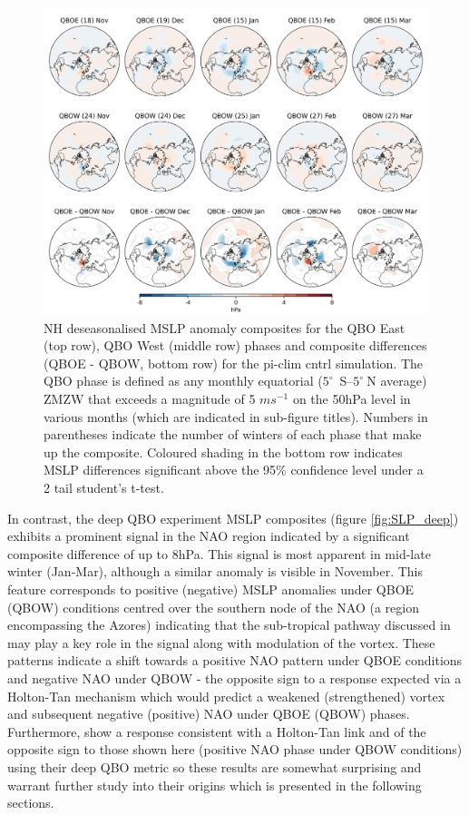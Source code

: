 \begin{figure}[h!]
\begin{center}
\noindent\includegraphics[width =0.8\linewidth]{Figures/Figures-deepQBO/SLP_composites_individual_months_QBO_phases_U_piclim_30hPa_5thresh.png}
\caption[]{NH deseasonalised MSLP anomaly composites for the QBO East (top row), QBO West (middle row) phases and composite differences (QBOE - QBOW, bottom row) for the pi-clim cntrl simulation. The QBO phase is defined as any monthly equatorial ($5^{\circ}$\ S--$5^{\circ}\ $N average) ZMZW that exceeds a magnitude of 5 $ms^{-1}$ on the 50hPa level in various months (which are indicated in sub-figure titles). Numbers in parentheses indicate the number of winters of each phase that make up the composite. Coloured shading in the bottom row indicates MSLP differences significant above the 95\% confidence level under a 2 tail student’s t-test.}
\label{fig:SLP_piclim}
\end{center}
\end{figure}

In contrast, the deep QBO experiment MSLP composites (figure \ref{fig:SLP_deep}) exhibits a prominent signal in the NAO region indicated by a significant composite difference of up to 8hPa. This signal is most apparent in mid-late winter (Jan-Mar), although a similar anomaly is visible in November. This feature corresponds to positive (negative) MSLP anomalies under QBOE (QBOW) conditions centred over the southern node of the NAO (a region encompassing the Azores) indicating that the sub-tropical pathway discussed in \cite{graySurface2018b} may play a key role in the signal along with modulation of the vortex. These patterns indicate a shift towards a positive NAO pattern under QBOE conditions and negative NAO under QBOW - the opposite sign to a response expected via a Holton-Tan mechanism which would predict a weakened (strengthened) vortex and subsequent negative (positive) NAO under QBOE (QBOW) phases. Furthermore, \cite{andrewsObserved2019d} show a response consistent with a Holton-Tan link and of the opposite sign to those shown here (positive NAO phase under QBOW conditions) using their deep QBO metric so these results are somewhat surprising and warrant further study into their origins which is presented in the following sections.


